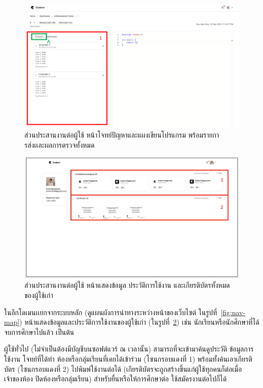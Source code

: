 \documentclass[12pt,one side,openright,a4paper]{cpe-thesis-th}
\newcommand{\thaijustify}[1]{%
  \par\hspace{30pt}\justifying
  #1
}
\begin{document}
    \hypertarget{ui-code2}{
        \begin{figure}[H]
        \centering
            \includegraphics[width=15cm]{figure/ui/ui-code2.png}
            \caption[ส่วนประสานงานต่อผู้ใช้ หน้าโจทย์ปัญหาและแผงเขียนโปรแกรม พร้อมรายการส่งเเละผลการตรวจทั้งหมด]{ส่วนประสานงานต่อผู้ใช้ หน้าโจทย์ปัญหาและแผงเขียนโปรแกรม พร้อมรายการส่งเเละผลการตรวจทั้งหมด}
            \label{fig:ui-code2}
        \end{figure}
    }
    \hypertarget{ui-archive1}{
        \begin{figure}[H]
        \centering
            \includegraphics[width=15cm]{figure/ui/ui-archive1.png}
            \caption[ส่วนประสานงานต่อผู้ใช้ หน้าแสดงข้อมูลของผู้ใช้เก่า]{ส่วนประสานงานต่อผู้ใช้ หน้าแสดงข้อมูล ประวัติการใช้งาน และเกียรติบัตรทั้งหมด ของผู้ใช้เก่า}
            \label{fig:ui-archive1}
        \end{figure}
    }
    \thaijustify{
        ในอีกโดเมนเเยกจากระบบหลัก (ดูแผนผังการนำทางระหว่างหน้าของเว็บไซต์ ในรูปที่~\ref{fig:nav-map}) หน้าแสดงข้อมูลและประวัติการใช้งานของผู้ใช้เก่า (ในรูปที่~\ref{fig:ui-archive1}) เช่น นักเรียนหรือนักศึกษาที่ได้จบการศึกษาไปแล้ว เป็นต้น 
    }
    \thaijustify{
        ผู้ใช้ทั่วไป (ไม่จำเป็นต้องมีบัญชีบนซอฟต์แวร์ ณ เวลานั้น) สามารถที่จะเข้ามาค้นดูประวัติ ข้อมูลการใช้งาน โจทย์ที่ได้ทำ ห้องหรือกลุ่มเรียนที่เคยได้เข้าร่วม (โซนกรอบแดงที่ 1) พร้อมทั้งค้นเอาเกียรติบัตร (โซนกรอบแดงที่ 2) ไปพิมพ์ใช้งานต่อได้ (เกียรติบัตรจะถูกสร้างขึ้นแก่ผู้ใช้ทุกคนก็ต่อเมื่อเจ้าของห้อง ปิดห้องหรือกลุ่มเรียน) สำหรับยื่นหรือให้การศึกษาต่อ ใช้สมัครงานต่อไปก็ได้
    }
\pagebreak
\end{document}
